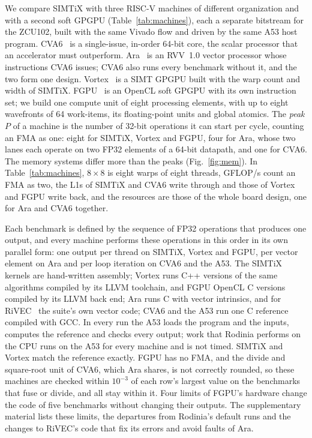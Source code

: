 \documentclass[journal]{IEEEtran}
\begin{document}
We compare SIMTiX with three RISC-V machines of different organization and with a
second soft GPGPU (Table~\ref{tab:machines}), each a separate bitstream for the ZCU102,
built with the same Vivado flow and driven by the same A53 host program. CVA6~\cite{cva6}
is a single-issue, in-order 64-bit core, the scalar processor that an accelerator must
outperform. Ara~\cite{ara,ara2} is an RVV~1.0 vector processor whose instructions CVA6
issues; CVA6 also runs every benchmark without it, and the two form one design.
Vortex~\cite{vortex} is a SIMT GPGPU built with the warp count and width of SIMTiX.
FGPU~\cite{fgpu} is an OpenCL soft GPGPU with its own instruction set; we build one
compute unit of eight processing elements, with up to eight wavefronts of 64
work-items, its floating-point units and global atomics. The \emph{peak} $P$ of a
machine is the number of 32-bit operations it can start per cycle, counting an FMA as
one: eight for SIMTiX, Vortex and FGPU, four for Ara, whose two lanes each operate on two
FP32 elements of a 64-bit datapath, and one for CVA6. The memory systems differ more
than the peaks (Fig.~\ref{fig:mem}). In Table~\ref{tab:machines}, $8\times8$ is eight
warps of eight threads, GFLOP/s count an FMA as two, the L1s of SIMTiX and CVA6 write
through and those of Vortex and FGPU write back, and the resources are those of the
whole board design, one for Ara and CVA6 together.

Each benchmark is defined by the sequence of FP32 operations that produces one output,
and every machine performs these operations in this order in its own parallel form:
one output per thread on SIMTiX, Vortex and FGPU, per vector element on Ara and per loop
iteration on CVA6 and the A53. The SIMTiX kernels are hand-written assembly; Vortex runs C++ versions of the same
algorithms compiled by its LLVM toolchain, and FGPU OpenCL C versions compiled by its
LLVM back end; Ara runs C with vector intrinsics, and for RiVEC~\cite{rivec} the
suite's own vector code; CVA6 and the A53 run one C reference compiled with GCC. In
every run the A53 loads the program and the inputs, computes the reference and checks
every output; work that Rodinia performs on the CPU runs on the A53 for every machine
and is not timed. SIMTiX and Vortex match the reference exactly. FGPU has no FMA, and
the divide and square-root unit of CVA6, which Ara shares, is not correctly rounded,
so these machines are checked within $10^{-3}$ of each row's largest value on the
benchmarks that fuse or divide, and all stay within it. Four limits of FGPU's
hardware change the code of five benchmarks without changing their outputs. The
supplementary material lists these limits, the departures from Rodinia's default
runs and the changes to RiVEC's code that fix its errors and avoid faults of Ara.
\end{document}
